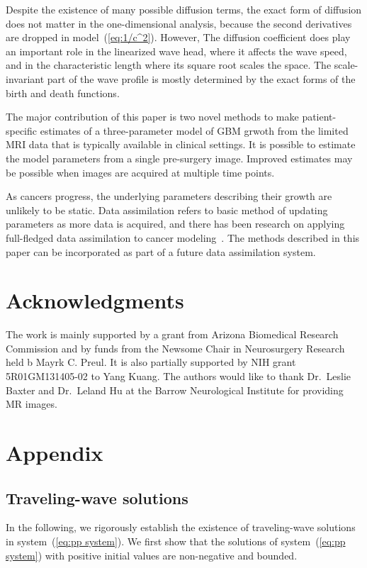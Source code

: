 \documentclass{aims}
\numberwithin{equation}{section}
\begin{document}
Despite the existence of many possible diffusion terms,
the exact form of diffusion does not matter in the one-dimensional analysis, because
the second derivatives are dropped in model~(\ref{eq:1/c^2}).  However,
The diffusion coefficient does play an important role in the linearized
wave head, where it affects the wave speed, and in the characteristic length
where its square root scales the space.  The scale-invariant
part of the wave profile is mostly determined by the exact forms of the
birth and death functions. 

The major contribution of this paper is two novel methods
to make patient-specific estimates of a three-parameter model of
GBM grwoth from the limited MRI data that is typically available in clinical settings.
It is possible to estimate the model parameters from a single pre-surgery image.
Improved estimates may be possible when images are acquired at multiple time points.

As cancers progress, the underlying parameters describing their growth are unlikely to be
static.  Data assimilation refers to basic method of updating parameters as more data is
acquired, and there has been research on applying full-fledged  data assimilation to cancer
modeling~\cite{Kostelich2011,McDaniel2013}.  The methods described in this paper can be
incorporated as part of a future data assimilation system.

\section*{Acknowledgments}
The work is mainly supported by a grant from Arizona Biomedical Research Commission
and by funds from the Newsome Chair in Neurosurgery Research held b Mayrk C. Preul. It is also partially supported by NIH grant 5R01GM131405-02 to Yang Kuang.
The authors would like to thank Dr.\ Leslie Baxter and Dr.\ Leland Hu at the Barrow
Neurological Institute for providing MR images.





\section*{Appendix}
\subsection*{Traveling-wave solutions}
In the following, we rigorously establish the existence of traveling-wave solutions in
system~(\ref{eq:pp system}).  We first show that the solutions of
system~(\ref{eq:pp system}) with positive initial values are non-negative and bounded.
 
\end{document}
